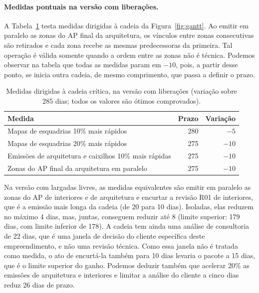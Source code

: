 \paragraph{Medidas pontuais na versão com liberações.}
A Tabela~\ref{tab:medidas} testa medidas dirigidas à cadeia da
Figura~\ref{fig:gantt}. Ao emitir em paralelo as zonas do AP final da
arquitetura, os vínculos entre zonas consecutivas são retirados e cada zona recebe as mesmas predecessoras da primeira. Tal operação é válida somente quando a ordem entre as zonas não é técnica. Podemos observar na tabela que todas as medidas param em $-10$, pois, a partir desse ponto, se inicia outra cadeia, de mesmo comprimento, que passa a definir o prazo.

\begin{table}[htbp]
  \centering
  \caption{Medidas dirigidas à cadeia crítica, na versão com liberações
  (variação sobre 285 dias; todos os valores são ótimos comprovados).}
  \label{tab:medidas}
  \small
  \begin{tabular}{lrr}
    \toprule
    Medida & Prazo & Variação \\
    \midrule
    Mapas de esquadrias 10\% mais rápidos                & 280 &  $-5$ \\
    Mapas de esquadrias 20\% mais rápidos                & 275 & $-10$ \\
    Emissões de arquitetura e caixilhos 10\% mais rápidas & 275 & $-10$ \\
    Zonas do AP final da arquitetura em paralelo          & 275 & $-10$ \\
    \bottomrule
  \end{tabular}
\end{table}

Na versão com largadas livres, as medidas equivalentes são emitir em
paralelo as zonas do AP de interiores e de arquitetura e encurtar a
revisão R01 de interiores, que é a emissão mais longa da cadeia (de 20 para 10
dias). Isoladas, elas reduzem no máximo 4 dias, mas, juntas, conseguem reduzir até 8 (limite
superior: 179 dias, com limite inferior de 178). A cadeia tem ainda uma
análise de consultoria de 22 dias, que é uma janela de decisão do cliente
específica deste empreendimento, e não uma revisão técnica. Como essa janela não é
tratada como medida, o ato de encurtá-la também para 10 dias levaria o pacote a
15 dias, que é o limite superior do ganho. Podemos deduzir também que acelerar
20\% as emissões de arquitetura e interiores e limitar a análise do
cliente a cinco dias reduz 26 dias de prazo.

